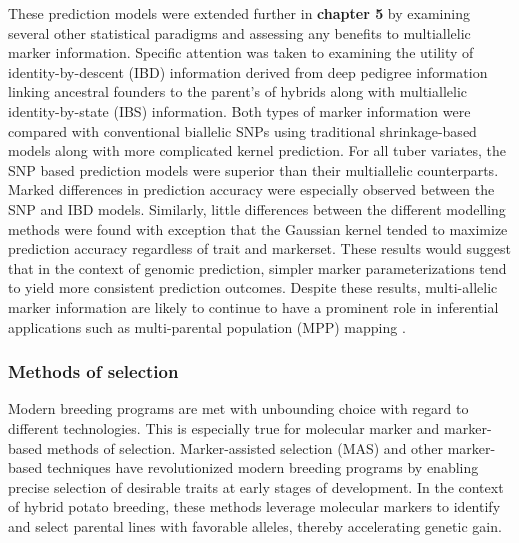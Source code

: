 \documentclass[
]{article}
\begin{document}
These prediction models were extended further in \textbf{chapter 5} by
examining several other statistical paradigms and assessing any benefits
to multiallelic marker information. Specific attention was taken to
examining the utility of identity-by-descent (IBD) information derived
from deep pedigree information linking ancestral founders to the
parent's of hybrids along with multiallelic identity-by-state (IBS)
information. Both types of marker information were compared with
conventional biallelic SNPs using traditional shrinkage-based models
along with more complicated kernel prediction. For all tuber variates,
the SNP based prediction models were superior than their multiallelic
counterparts. Marked differences in prediction accuracy were especially
observed between the SNP and IBD models. Similarly, little differences
between the different modelling methods were found with exception that
the Gaussian kernel tended to maximize prediction accuracy regardless of
trait and markerset. These results would suggest that in the context of
genomic prediction, simpler marker parameterizations tend to yield more
consistent prediction outcomes. Despite these results, multi-allelic
marker information are likely to continue to have a prominent role in
inferential applications such as multi-parental population (MPP) mapping
\autocite{Li2021a}.

\subsubsection{Methods of selection}\label{methods-of-selection}

Modern breeding programs are met with unbounding choice with regard to
different technologies. This is especially true for molecular marker and
marker-based methods of selection. Marker-assisted selection (MAS) and
other marker-based techniques have revolutionized modern breeding
programs by enabling precise selection of desirable traits at early
stages of development. In the context of hybrid potato breeding, these
methods leverage molecular markers to identify and select parental lines
with favorable alleles, thereby accelerating genetic gain.
\end{document}
